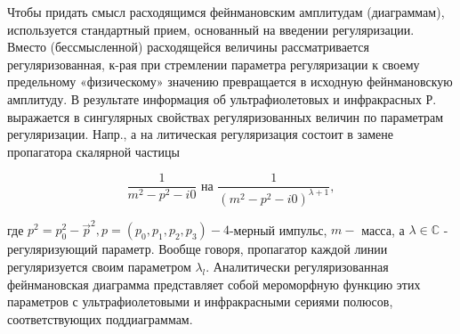 \documentclass[10pt]{article}
\begin{document}
Чтобы придать смысл расходящимся фейнмановским амплитудам (диаграммам), используется стандартный прием, основанный на введении регуляризации. Вместо (бессмысленной) расходящейся величины рассматривается регуляризованная, к-рая при стремлении параметра регуляризации к своему предельному «физическому» значению превращается в исходную фейнмановскую амплитуду. В результате информация об ультрафиолетовых и инфракрасных Р. выражается в сингулярных свойствах регуляризованных величин по параметрам регуляризации. Напр., а на литическая регуляризация состоит в замене пропагатора скалярной частицы



\[

\frac{1}{m^{2}-p^{2}-i 0} \text { на } \frac{1}{\left(m^{2}-p^{2}-i 0\right)^{\lambda+1}},

\]



где $p^{2}=p_{0}^{2}-\vec{p}^{2}, p=\left(p_{0}, p_{1}, p_{2}, p_{3}\right)-4$-мерный импульс, $m-$ масса, а $\lambda \in \mathbb{C}$ - регуляризующий параметр. Вообще говоря, пропагатор каждой линии регуляризуется своим параметром $\lambda_{l}$. Аналитически регуляризованная фейнмановская диаграмма представляет собой мероморфную функцию этих параметров с ультрафиолетовыми и инфракрасными сериями полюсов, соответствующих поддиаграммам.
\end{document}
